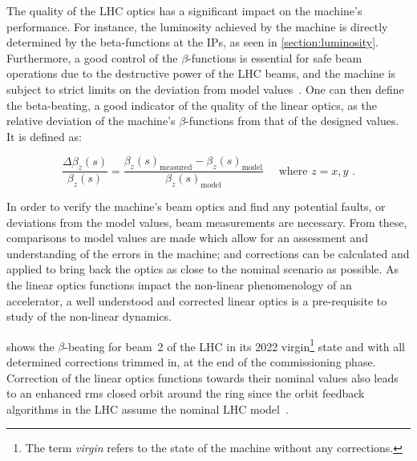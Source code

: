 The quality of the \gls{LHC} optics has a significant impact on the machine's performance.
For instance, the luminosity achieved by the machine is directly determined by the \glspl{beta-function} at the \glspl{IP}, as seen in \cref{section:luminosity}.
Furthermore, a good control of the \(\beta\)-functions is essential for safe beam operations due to the destructive power of the LHC beams, and the machine is subject to strict limits on the deviation from model values~\cite{CERN:Bruning:Field_Quality_Spec_LHC_Main_Dipoles}.
One can then define the \gls{beta-beating}, a good indicator of the quality of the linear \gls{optics}, as the relative deviation of the machine's \(\beta\)-functions from that of the designed values.
It is defined as:

\begin{equation}
  \frac{\Delta \beta_z(s)}{\beta_z(s)} = \frac{\beta_z(s)_{\mathrm{measured}} - \beta_z(s)_{\mathrm{model}}}{\beta_z(s)_{\mathrm{model}}} \quad \text { where } z = x, y \text{ .}
  \label{equation:beta_beating_definition}
\end{equation}
\vspace{0.3mm}

In order to verify the machine's beam optics and find any potential faults, or deviations from the model values, beam measurements are necessary.
From these, comparisons to model values are made which allow for an assessment and understanding of the errors in the machine; and corrections can be calculated and applied to bring back the optics as close to the nominal scenario as possible.
As the linear optics functions impact the non-linear phenomenology of an accelerator, a well understood and corrected linear optics is a pre-requisite to study of the non-linear dynamics.

 shows the \(\beta\)-beating for beam~\num{2} of the LHC in its \num{2022} virgin\footnote{The term \textit{virgin} refers to the state of the machine without any corrections.} state and with all determined corrections trimmed in, at the end of the commissioning phase.
Correction of the linear optics functions towards their nominal values also leads to an enhanced rms closed orbit around the ring since the orbit feedback algorithms in the LHC assume the nominal LHC model~\cite{PRAB:Tomas:Record_Low_Beta_Beating_in_the_LHC, PRAB:Persson:LHC_Optics_Commissioning_OnePercent}.

